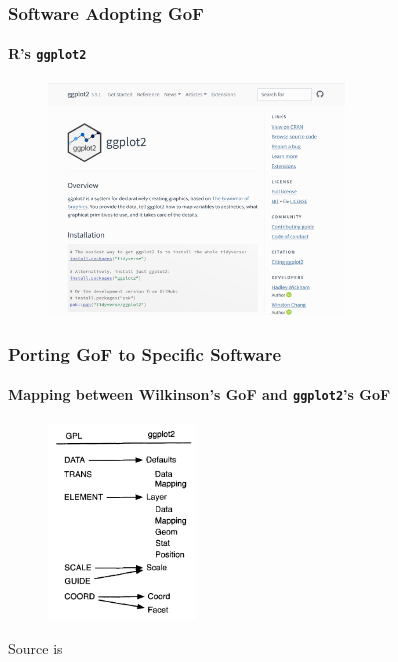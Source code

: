\documentclass[aspectratio=1610]{beamer}
\begin{document}
\begin{frame}
	\frametitle{Software Adopting GoF}
	\framesubtitle{R's \texttt{ggplot2}}
	\begin{figure}
		\begin{center}
			\includegraphics[width=0.7\textwidth]{figures/ggplot2.png}
		\end{center}
	\end{figure}
\end{frame}

\begin{frame}
	\frametitle{Porting GoF to Specific Software}
	\framesubtitle{Mapping between Wilkinson's GoF and \texttt{ggplot2}'s GoF}
	\begin{figure}
		\begin{center}
			\includegraphics[width=0.35\textwidth]{figures/ggplot2_gof.png}
		\end{center}
	\end{figure}
	Source is \parencite{wickhamLayeredGrammarGraphics2010}
\end{frame}
\end{document}
